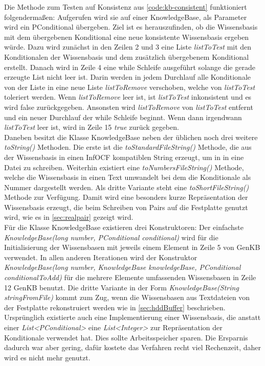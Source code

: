 \documentclass[12pt,a4paper]{article}
\begin{document}
Die Methode zum Testen auf Konsistenz aus \autoref{code:kb-consistent} funktioniert folgendermaßen: Aufgerufen wird sie auf einer KnowledgeBase, als Parameter wird ein PConditional übergeben. Ziel ist es herauszufinden, ob die Wissensbasis mit dem übergebenen Konditional eine neue konsistente Wissensbasis ergeben würde. Dazu wird zunächst in den Zeilen 2 und 3 eine Liste \textit{listToTest} mit den Konditionalen der Wissensbasis und dem zusätzlich übergebenem Konditional erstellt. Danach wird in Zeile 4 eine while Schleife ausgeführt solange die gerade erzeugte List nicht leer ist. Darin werden in jedem Durchlauf alle Konditionale von der Liste in eine neue Liste \textit{listToRemove} verschoben, welche von \textit{listToTest} toleriert werden. Wenn \textit{listToRemove} leer ist, ist \textit{listToTest} inkonsistent und es wird false zurückgegeben. Ansonsten wird \textit{listToRemove} von \textit{listToTest} entfernt und ein neuer Durchlauf der while Schleife beginnt. Wenn dann irgendwann \textit{listToTest} leer ist, wird in Zeile 15 \textit{true} zurück gegeben. \\
Daneben besitzt die Klasse KnowledgeBase neben der üblichen noch drei weitere \textit{toString()} Methoden. Die erste ist die \textit{toStandardFileString()} Methode, die aus der Wissensbasis in einen InfOCF kompatiblen String erzeugt, um in in eine Datei zu schreiben. Weiterhin existiert eine \textit{toNumbersFileString()} Methode, welche die Wissensbasis in einen Text umwandelt bei dem die Konditionale als Nummer dargestellt werden. Als dritte Variante steht eine \textit{toShortFileString()} Methode zur Verfügung. Damit wird eine besonders kurze Repräsentation der Wissensbasis erzeugt, die beim Schreiben von Pairs auf die Festplatte genutzt wird, wie es in \autoref{sec:realpair} gezeigt wird. \\
Für die Klasse KnowledgeBase existieren drei Konstruktoren: Der einfachste \textit{KnowledgeBase(long number, PConditional conditional)} wird für die Initialisierung der Wissensbasen mit jeweils einem Element in Zeile 5 von GenKB verwendet. In allen anderen Iterationen wird der Konstruktor \textit{KnowledgeBase(long number, KnowledgeBase knowledgeBase, PConditional conditionalToAdd)} für die mehrere Elemente umfassenden Wissensbasen in Zeile 12 GenKB benutzt. Die dritte Variante in der Form \textit{KnowledgeBase(String stringFromFile)} kommt zum Zug, wenn die Wissensbasen aus Textdateien von der Festplatte rekonstruiert werden wie in \autoref{sec:hddBuffer} beschrieben. \\
Ursprünglich existierte auch eine Implementierung einer Wissensbasis, die anstatt einer \textit{List<PConditional>} eine \textit{List<Integer>} zur Repräsentation der Konditionale verwendet hat. Dies sollte Arbeitsspeicher sparen. Die Ersparnis dadurch war aber gering, dafür kostete das Verfahren recht viel Rechenzeit, daher wird es nicht mehr genutzt.
\end{document}
